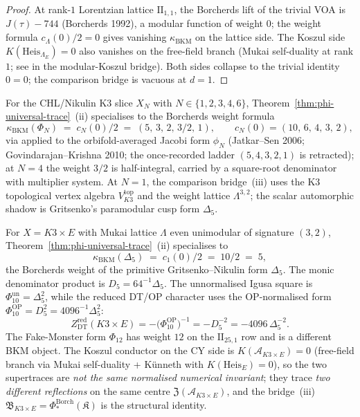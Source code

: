 \begin{proof}
At rank-$1$ Lorentzian lattice $\mathrm{II}_{1,1}$, the Borcherds lift of
the trivial VOA is $J(\tau) - 744$ (Borcherds 1992), a modular function
of weight $0$; the weight formula $c_\Lambda(0)/2 = 0$ gives vanishing
$\kappa_{\mathrm{BKM}}$ on the lattice side. The Koszul side
$K(\mathrm{Heis}_{\Lambda_E}) = 0$ also vanishes on the free-field
branch (Mukai self-duality at rank $1$; see
\cite{VolI} in the modular-Koszul
bridge). Both sides collapse to the trivial identity $0 = 0$; the
comparison bridge is vacuous at $d = 1$.
\end{proof}

\begin{corollary}[\texorpdfstring{$d = 2$}{d = 2}: K\texorpdfstring{$3$}{3} CHL slices]
\label{cor:phi-trace-d2}
For the CHL/Nikulin K3 slice \(X_N\) with
\(N \in \{1,2,3,4,6\}\),
Theorem~\ref{thm:phi-universal-trace}~(ii) specialises to the Borcherds
weight formula
\[
 \kappa_{\mathrm{BKM}}(\Phi_N) \;=\; c_N(0)/2
 \;=\; (5,\,3,\,2,\,3/2,\,1),
 \qquad c_N(0) = (10,\,6,\,4,\,3,\,2),
\]
via \cite{VolI} applied to the orbifold-averaged
Jacobi form $\phi_N$ (Jatkar--Sen 2006; Govindarajan--Krishna 2010; the
once-recorded ladder $(5,4,3,2,1)$ is retracted); at $N = 4$ the weight
$3/2$ is half-integral, carried by a square-root denominator with
multiplier system. At \(N=1\), the comparison bridge~(iii) uses the
K$3$ topological vertex algebra \(V_{K3}^{\mathrm{top}}\) and the
weight lattice \(\Lambda^{3,2}\); the scalar automorphic shadow is
Gritsenko's paramodular cusp form \(\Delta_5\).
\end{corollary}

\begin{corollary}[\texorpdfstring{$d = 3$}{d = 3}: K\texorpdfstring{$3 \times E$}{3 x E} via \texorpdfstring{$\Delta_5$}{Delta5} and its unnormalised \texorpdfstring{$\Phi_{10}^{\mathrm{un}}$}{Phi10un} square]
\label{cor:phi-trace-d3}
For $X = K3 \times E$ with Mukai lattice $\Lambda$ even unimodular of
signature $(3, 2)$, Theorem~\ref{thm:phi-universal-trace}~(ii) specialises to
\[
 \kappa_{\mathrm{BKM}}(\Delta_5) \;=\; c_1(0)/2 \;=\; 10/2 \;=\; 5,
\]
the Borcherds weight of the primitive Gritsenko--Nikulin form
\(\Delta_5\). The monic denominator product is
\(D_5=64^{-1}\Delta_5\). The unnormalised Igusa square is
\(\Phi_{10}^{\mathrm{un}}=\Delta_5^2\), while the reduced DT/OP
character uses the OP-normalised form
\(\Phi_{10}^{\mathrm{OP}}=D_5^2=4096^{-1}\Delta_5^2\):
\[
 Z^{\mathrm{red}}_{\mathrm{DT}}(K3\times E)
 =-\bigl(\Phi_{10}^{\mathrm{OP}}\bigr)^{-1}
 =-D_5^{-2}
 =-4096\,\Delta_5^{-2}.
\]
The Fake-Monster form $\Phi_{12}$ has weight $12$ on the
$\mathrm{II}_{25,1}$ row and is a different BKM object. The Koszul conductor
on the CY side is $K(\mathcal{A}_{K3\times E}) = 0$ (free-field branch
via Mukai self-duality + K\"unneth with $K(\mathrm{Heis}_E) = 0$), so the
two supertraces are \emph{not the same normalised numerical invariant};
they trace \emph{two different reflections} on the same centre
$\mathfrak{Z}(\mathcal{A}_{K3\times E})$, and the bridge~(iii)
$\mathfrak{B}_{K3\times E} = \Phi^{\mathrm{Borch}}_*(\mathfrak{K})$ is the
structural identity.
\end{corollary}

